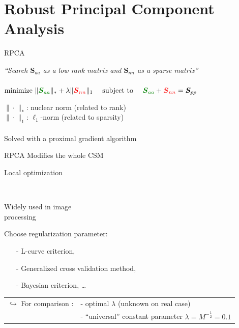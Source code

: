 \documentclass[10pt,xcolor=x11names,compress, notes=show]{beamer}%
\newcommand{\citeTransp}[1]{\color{fg!50} \citep{#1}}
\begin{document}
\section{Robust Principal Component Analysis}
\begin{frame}
\end{frame}
\begin{frame}{RPCA}
	\vspace{-0.5cm}
	\begin{center}
		\textit{``Search $\bm{S}_{aa}$ as a low rank matrix and $\bm{S}_{nn}$ as a sparse matrix''}\\~\\
		\colorbox{gray!20}{
		 $\text{minimize~} \|\textcolor{green}{\bm{{S}}_{aa}} \|_* + \lambda \| \textcolor{red}{\bm{{S}}_{nn}} \|_1  \text{~~~~subject to~~~~} \textcolor{green}{ \bm{{S}}_{aa}} +  \textcolor{red}{\bm{{S}}_{nn}} = \bm{S}_{pp}$
		}
	\end{center}


	
	$\| \cdot \|_*$: nuclear norm (related to rank)\\
	$\| \cdot \|_1$: $\ell_1$-norm (related to sparsity)\\~\\
	
	Solved with a proximal gradient algorithm
	\vfill

	\begin{block}{RPCA  \citeTransp{Wright2009a}}
		 Modifies the whole CSM		\hfill\parbox{0.56\linewidth}{ Local optimization}\\[2pt]
		\parbox{0.42\linewidth}{ Widely used in image\\ processing}\hfill\parbox{0.56\linewidth}{ Choose regularization parameter:
		\small
		\begin{itemize}
			\setlength{\itemindent}{0.3cm}
		        \item[-] L-curve criterion,\\[-2pt]
		        \item[-] Generalized cross validation method,\\[-2pt]
		       \item[-] Bayesian criterion, \dots
		\end{itemize}
		}
	\end{block}
	\vfill
	\begin{tabular}{rl}
	$\hookrightarrow$ For comparison :& - optimal $\lambda$  (unknown on real case)\\
	& - ``universal'' constant  parameter $\lambda=M^{-\frac{1}{2}}=0.1$
	\end{tabular}

\end{frame}
\end{document}
